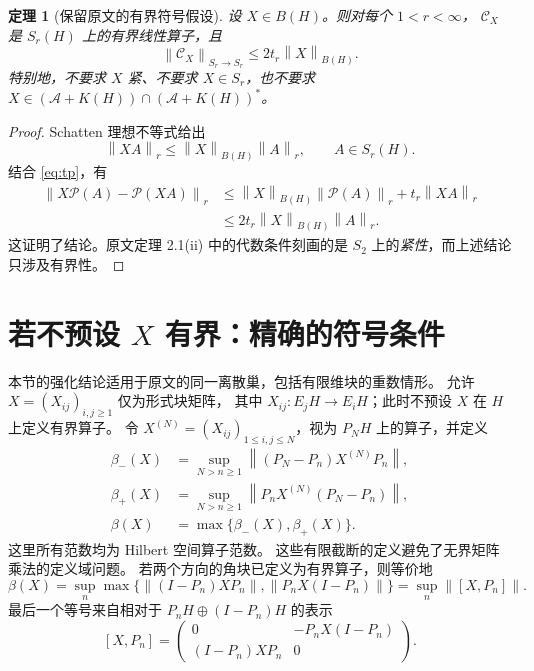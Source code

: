 \documentclass[UTF8,11pt,a4paper,fontset=fandol]{ctexart}
\newtheorem{theorem}{定理}[section]
\theoremstyle{remark}
\newcommand{\BH}{B(H)}
\newcommand{\PP}{\mathcal P}
\newcommand{\Alg}{\mathcal A}
\newcommand{\CC}{\mathcal C}
\newcommand{\norm}[1]{\left\lVert #1\right\rVert}
\numberwithin{equation}{section}
\begin{document}
\begin{theorem}[保留原文的有界符号假设]\label{thm:bounded}
设 $X\in\BH$。则对每个 $1<r<\infty$，
$\CC_X$ 是 $S_r(H)$ 上的有界线性算子，且
\begin{equation}\label{eq:easybound}
 \norm{\CC_X}_{S_r\to S_r}\leq 2t_r\norm{X}_{\BH}.
\end{equation}
特别地，不要求 $X$ 紧、不要求 $X\in S_r$，也不要求
$X\in(\Alg+K(H))\cap(\Alg+K(H))^*$。
\end{theorem}

\begin{proof}
Schatten 理想不等式给出
\[
 \norm{XA}_r\leq\norm{X}_{\BH}\norm{A}_r,
 \qquad A\in S_r(H).
\]
结合 \eqref{eq:tp}，有
\begin{align*}
 \norm{X\PP(A)-\PP(XA)}_r
 &\leq\norm{X}_{\BH}\norm{\PP(A)}_r
       +t_r\norm{XA}_r\\
 &\leq 2t_r\norm{X}_{\BH}\norm{A}_r.
\end{align*}
这证明了结论。原文定理 2.1(ii) 中的代数条件刻画的是
$S_2$ 上的\emph{紧性}，而上述结论只涉及有界性。
\end{proof}

\section{若不预设 \texorpdfstring{$X$}{X} 有界：精确的符号条件}

本节的强化结论适用于原文的同一离散巢，包括有限维块的重数情形。
允许 $X=(X_{ij})_{i,j\geq1}$ 仅为形式块矩阵，
其中 $X_{ij}:E_jH\to E_iH$；此时不预设 $X$ 在 $H$ 上定义有界算子。
令 $X^{(N)}=(X_{ij})_{1\leq i,j\leq N}$，视为 $P_NH$ 上的算子，并定义
\begin{align}
 \beta_-(X)&=\sup_{N>n\geq1}
     \norm{(P_N-P_n)X^{(N)}P_n},\label{eq:beta-}\\
 \beta_+(X)&=\sup_{N>n\geq1}
     \norm{P_nX^{(N)}(P_N-P_n)},\label{eq:beta+}\\
 \beta(X)&=\max\{\beta_-(X),\beta_+(X)\}.\label{eq:beta}
\end{align}
这里所有范数均为 Hilbert 空间算子范数。
这些有限截断的定义避免了无界矩阵乘法的定义域问题。
若两个方向的角块已定义为有界算子，则等价地
\begin{equation}\label{eq:cut}
 \beta(X)=\sup_n\max\{
 \norm{(I-P_n)XP_n},\norm{P_nX(I-P_n)}\}
 =\sup_n\norm{[X,P_n]}.
\end{equation}
最后一个等号来自相对于 $P_nH\oplus(I-P_n)H$ 的表示
\[
 [X,P_n]=\begin{pmatrix}
 0&-P_nX(I-P_n)\\
 (I-P_n)XP_n&0
 \end{pmatrix}.
\]
\end{document}
